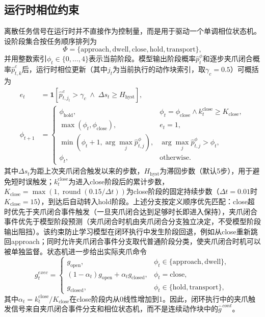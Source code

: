 \subsection{运行时相位约束}

离散任务信号在运行时并不直接作为控制量，而是用于驱动一个单调相位状态机。设阶段集合按任务顺序排列为
\begin{equation}
    \Phi=\{\mathrm{approach},\mathrm{dwell},\mathrm{close},\mathrm{hold},\mathrm{transport}\},
    \label{eq:phase-set}
\end{equation}
并用整数索引$\phi_t\in\{0,\ldots,4\}$表示当前阶段。模型输出阶段概率$\hat{p}^\phi_t$和逐步夹爪闭合概率$\hat{p}^c_{t,k}$后，运行时相位更新（其中$j_t$为当前执行的动作块索引，取$\gamma_c=0.5$）可概括为
\begin{align}
    e_t &= \mathbf{1}\left[\hat{p}^c_{t,j_t}>\gamma_c \;\land\; \Delta s_t \geq H_{\mathrm{hyst}}\right],\\
    \phi_{t+1} &=
    \begin{cases}
        \phi_{\mathrm{hold}}, & \phi_t=\phi_{\mathrm{close}} \land k^{\mathrm{close}}_t \geq K_{\mathrm{close}},\\[2pt]
        \max(\phi_t,\phi_{\mathrm{close}}), & e_t=1,\\[2pt]
        \min\left(\phi_t+1,\arg\max_j \hat{p}^\phi_{t,j}\right), & \arg\max_j \hat{p}^\phi_{t,j}>\phi_t,\\[2pt]
        \phi_t, & \text{otherwise}.
    \end{cases}
    \label{eq:phase-fsm}
\end{align}
其中$\Delta s_t$为距上次夹爪闭合触发以来的步数，$H_{\mathrm{hyst}}$为滞回步数（默认5步），用于避免短时误触发；$k^{\mathrm{close}}_t$为进入close阶段后的累计步数，$K_{\mathrm{close}}=\max(1,\operatorname{round}(0.15/\Delta t))$为close阶段的固定持续步数（$\Delta t=0.01$时$K_{\mathrm{close}}=15$），到达后自动转入hold阶段。上述分支按定义顺序优先匹配：close超时优先于夹爪闭合事件触发（一旦夹爪闭合达到足够时长即进入保持），夹爪闭合事件优先于模型阶段预测（夹爪闭合时机由夹爪闭合分支独立决定，不受模型阶段输出阻挡）。该约束防止学习模型在闭环执行中发生阶段回退，例如从close重新跳回approach；同时允许夹爪闭合事件分支取代普通阶段分类，使夹爪闭合时机可以被单独监督。状态机进一步给出实际夹爪命令
\begin{equation}
    g^{exec}_t =
    \begin{cases}
        g_{\mathrm{open}}, & \phi_t\in\{\mathrm{approach},\mathrm{dwell}\},\\
        (1-\alpha_t)g_{\mathrm{open}}+\alpha_t g_{\mathrm{closed}}, & \phi_t=\mathrm{close},\\
        g_{\mathrm{closed}}, & \phi_t\in\{\mathrm{hold},\mathrm{transport}\},
    \end{cases}
    \label{eq:fsm-gripper-command}
\end{equation}
其中$\alpha_t = k^{\mathrm{close}}_t / K_{\mathrm{close}}$在close阶段内从0线性增加到1。因此，闭环执行中的夹爪触发信号来自夹爪闭合事件分支和相位状态机，而不是连续动作块中的$\hat{g}^{\,cont}$。


